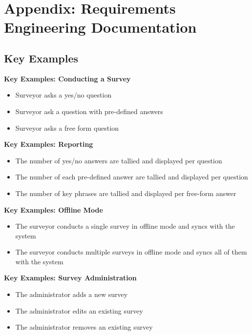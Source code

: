 \documentclass[12pt]{witseiepaper}
\begin{document}
\renewcommand{\bibname}{REFERENCES}
\renewcommand*{\bibfont}{\raggedright}




\newpage



\pagestyle{plain}
\renewcommand\thesection{\Alph{section}}
\setcounter{section}{0}

\section{Appendix: Requirements Engineering Documentation}

\subsection{Key Examples}

\textbf{Key Examples: Conducting a Survey}
\begin{itemize}
\item Surveyor asks a yes/no question 
\item Surveyor ask a question with pre-defined answers
\item Surveyor asks a free form question
\end{itemize}


\textbf{Key Examples: Reporting}
\begin{itemize}
\item The number of yes/no answers are tallied and displayed per question
\item The number of each pre-defined answer are tallied and displayed per question
\item The number of key phrases are tallied and displayed per free-form answer
\end{itemize}


\textbf{Key Examples: Offline Mode}
\begin{itemize}
\item The surveyor conducts a single survey in offline mode and syncs with the system
\item The surveyor conducts multiple surveys in offline mode and syncs all of them with the system
\end{itemize}

\textbf{Key Examples: Survey Administration}
\begin{itemize}
\item The administrator adds a new survey
\item The administrator edits an existing survey
\item The administrator removes an existing survey
\end{itemize}
\end{document}
